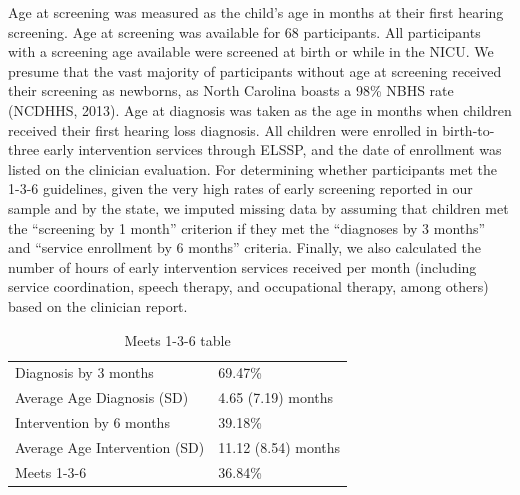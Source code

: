 \documentclass[english,man]{apa6}
\begin{document}
Age at screening was measured as the child's age in months at their first hearing screening. Age at screening was available for 68 participants. All participants with a screening age available were screened at birth or while in the NICU. We presume that the vast majority of participants without age at screening received their screening as newborns, as North Carolina boasts a 98\% NBHS rate (NCDHHS, 2013). Age at diagnosis was taken as the age in months when children received their first hearing loss diagnosis. All children were enrolled in birth-to-three early intervention services through ELSSP, and the date of enrollment was listed on the clinician evaluation. For determining whether participants met the 1-3-6 guidelines, given the very high rates of early screening reported in our sample and by the state, we imputed missing data by assuming that children met the \enquote{screening by 1 month} criterion if they met the \enquote{diagnoses by 3 months} and \enquote{service enrollment by 6 months} criteria. Finally, we also calculated the number of hours of early intervention services received per month (including service coordination, speech therapy, and occupational therapy, among others) based on the clinician report.

\begin{table}[!h]

\caption{\label{tab:meets136-info}Meets 1-3-6 table}
\centering
\begin{tabular}[t]{l|l}
\hline
 & \\
\hline
Diagnosis by 3 months & 69.47\%\\
\hline
Average Age Diagnosis (SD) & 4.65 (7.19) months\\
\hline
Intervention by 6 months & 39.18\%\\
\hline
Average Age Intervention (SD) & 11.12 (8.54) months\\
\hline
Meets 1-3-6 & 36.84\%\\
\hline
\end{tabular}
\end{table}
\end{document}
